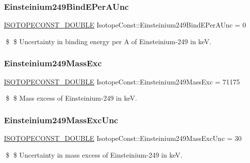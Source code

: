 \subsubsection{\texorpdfstring{Einsteinium249\+Bind\+E\+Per\+A\+Unc}{Einsteinium249BindEPerAUnc}}
{\footnotesize\ttfamily \mbox{\hyperlink{group___isotope_const-_macros_ga8f45a7272ce02c0b4c65c44636ed719a}{I\+S\+O\+T\+O\+P\+E\+C\+O\+N\+S\+T\+\_\+\+D\+O\+U\+B\+LE}} Isotope\+Const\+::\+Einsteinium249\+Bind\+E\+Per\+A\+Unc = 0}

\$ \$ Uncertainty in binding energy per A of Einsteinium-\/249 in keV. \mbox{\label{group___isotope_const-_einsteinium-_es249_ga130c57608347710b86ee18d0933de215}} 
\subsubsection{\texorpdfstring{Einsteinium249\+Mass\+Exc}{Einsteinium249MassExc}}
{\footnotesize\ttfamily \mbox{\hyperlink{group___isotope_const-_macros_ga8f45a7272ce02c0b4c65c44636ed719a}{I\+S\+O\+T\+O\+P\+E\+C\+O\+N\+S\+T\+\_\+\+D\+O\+U\+B\+LE}} Isotope\+Const\+::\+Einsteinium249\+Mass\+Exc = 71175}

\$ \$ Mass excess of Einsteinium-\/249 in keV. \mbox{\label{group___isotope_const-_einsteinium-_es249_gad09ae321e0359791729cbff74dbac73a}} 
\subsubsection{\texorpdfstring{Einsteinium249\+Mass\+Exc\+Unc}{Einsteinium249MassExcUnc}}
{\footnotesize\ttfamily \mbox{\hyperlink{group___isotope_const-_macros_ga8f45a7272ce02c0b4c65c44636ed719a}{I\+S\+O\+T\+O\+P\+E\+C\+O\+N\+S\+T\+\_\+\+D\+O\+U\+B\+LE}} Isotope\+Const\+::\+Einsteinium249\+Mass\+Exc\+Unc = 30}

\$ \$ Uncertainty in mass excess of Einsteinium-\/249 in keV. \mbox{\label{group___isotope_const-_einsteinium-_es249_ga0a1a92e88ce657aa4522095048f80a83}} 
